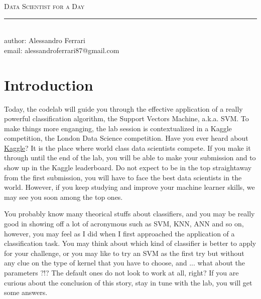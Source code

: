 \documentclass[aps,letterpaper,10pt]{revtex4}
\makeatletter
\newcommand{\labtitle}{Data Scientist for a Day}
\newcommand{\authorname}{Alessandro Ferrari}
\newcommand{\emailauthor}{alessandroferrari87@gmail.com}
\makeatother
\begin{document}


\begin{titlepage}
\begin{center}
{\Large \textsc{\labtitle} \\ \vspace{4pt}} 
\rule[13pt]{\textwidth}{1pt} \\ \vspace{150pt}
{\large author: \authorname \\ \vspace{10pt}
email: \emailauthor \\ \vspace{10pt}}
\end{center}
\end{titlepage}


\section{Introduction}
Today, the codelab will guide you through the effective application of a really powerful classification algorithm, the Support Vectors Machine, a.k.a. SVM. To make things more enganging, the lab session is contextualized in a Kaggle competition, the London Data Science competition. Have you ever heard about \href{www.kaggle.com}{Kaggle}? It is the place where world class data scientists compete. If you make it through until the end of the lab, you will be able to make your submission and to show up in the Kaggle leaderboard. Do not expect to be in the top straightaway from the first submission, you will have to face the best data scientists in the world. However, if you keep studying and improve your machine learner skills, we may see you soon among the top ones.

You probably know many theorical stuffs about classifiers, and you may be really good in showing off a lot of acronymous such as SVM, KNN, ANN and so on, however, you may feel as I did when I first approached the application of a classification task. You may think about which kind of classifier is better to apply for your challenge, or you may like to try an SVM as the first try but without any clue on the type of kernel that you have to choose, and ... what about the parameters ?!? The default ones do not look to work at all, right? If you are curious about the conclusion of this story, stay in tune with the lab, you will get some answers.
\end{document}
